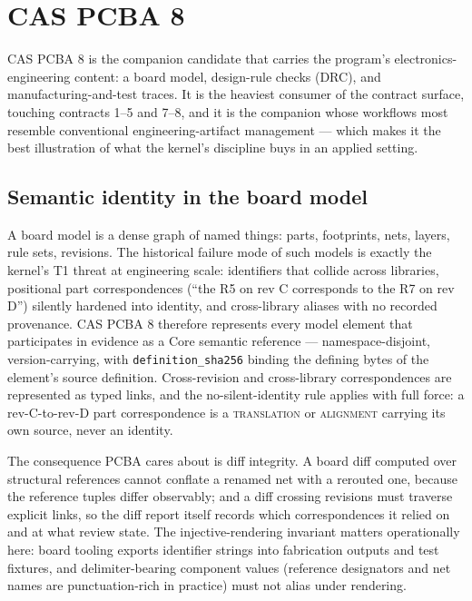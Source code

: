 \section{CAS PCBA 8}\label{integ:pcba}

CAS PCBA 8 is the companion candidate that carries the program's electronics-engineering content: a board model, design-rule checks (DRC), and manufacturing-and-test traces. It is the heaviest consumer of the contract surface, touching contracts 1--5 and 7--8, and it is the companion whose workflows most resemble conventional engineering-artifact management --- which makes it the best illustration of what the kernel's discipline buys in an applied setting.

\subsection{Semantic identity in the board model}\label{integ:pcba:identity}

A board model is a dense graph of named things: parts, footprints, nets, layers, rule sets, revisions. The historical failure mode of such models is exactly the kernel's T1 threat at engineering scale: identifiers that collide across libraries, positional part correspondences (``the R5 on rev C corresponds to the R7 on rev D'') silently hardened into identity, and cross-library aliases with no recorded provenance. CAS PCBA 8 therefore represents every model element that participates in evidence as a Core semantic reference --- namespace-disjoint, version-carrying, with \texttt{definition\_sha256} binding the defining bytes of the element's source definition. Cross-revision and cross-library correspondences are represented as typed links, and the no-silent-identity rule applies with full force: a rev-C-to-rev-D part correspondence is a \textsc{translation} or \textsc{alignment} carrying its own source, never an identity.

The consequence PCBA cares about is diff integrity. A board diff computed over structural references cannot conflate a renamed net with a rerouted one, because the reference tuples differ observably; and a diff crossing revisions must traverse explicit links, so the diff report itself records which correspondences it relied on and at what review state. The injective-rendering invariant matters operationally here: board tooling exports identifier strings into fabrication outputs and test fixtures, and delimiter-bearing component values (reference designators and net names are punctuation-rich in practice) must not alias under rendering.

